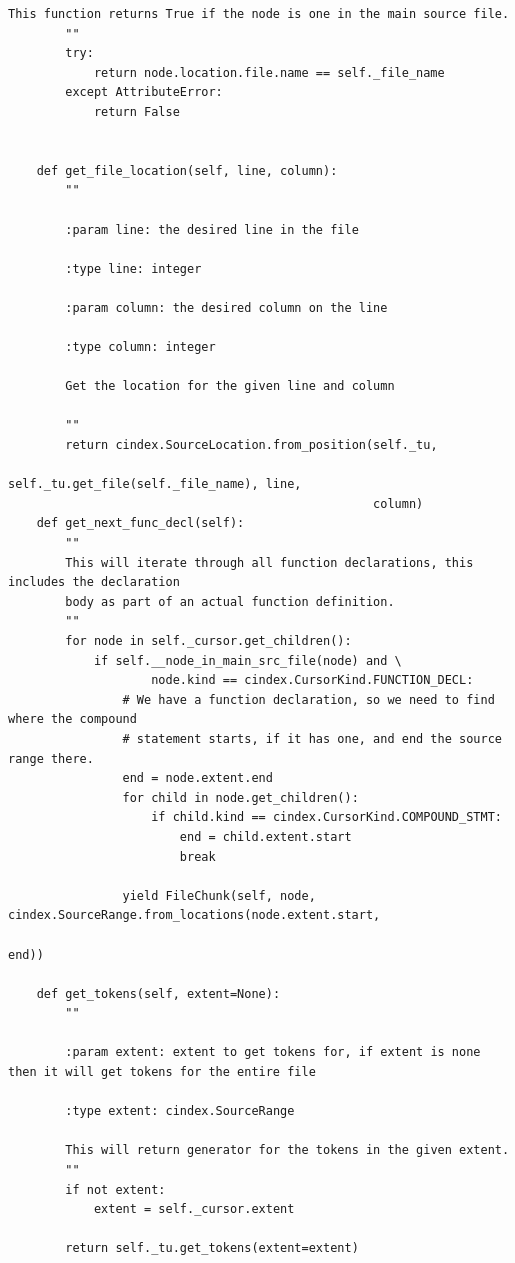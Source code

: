 \documentclass[11pt]{scrreprt}
\begin{document}
\begin{lstlisting}[frame=single,basicstyle=\small]
        This function returns True if the node is one in the main source file.
        ""
        try:
            return node.location.file.name == self._file_name
        except AttributeError:
            return False


    def get_file_location(self, line, column):
        ""

        :param line: the desired line in the file

        :type line: integer

        :param column: the desired column on the line

        :type column: integer

        Get the location for the given line and column

        ""
        return cindex.SourceLocation.from_position(self._tu,
                                                   self._tu.get_file(self._file_name), line,
                                                   column)
    def get_next_func_decl(self):
        ""
        This will iterate through all function declarations, this includes the declaration
        body as part of an actual function definition.
        ""
        for node in self._cursor.get_children():
            if self.__node_in_main_src_file(node) and \
                    node.kind == cindex.CursorKind.FUNCTION_DECL:
                # We have a function declaration, so we need to find where the compound
                # statement starts, if it has one, and end the source range there.
                end = node.extent.end
                for child in node.get_children():
                    if child.kind == cindex.CursorKind.COMPOUND_STMT:
                        end = child.extent.start
                        break

                yield FileChunk(self, node, cindex.SourceRange.from_locations(node.extent.start,
                                                                              end))

    def get_tokens(self, extent=None):
        ""

        :param extent: extent to get tokens for, if extent is none then it will get tokens for the entire file

        :type extent: cindex.SourceRange

        This will return generator for the tokens in the given extent.
        ""
        if not extent:
            extent = self._cursor.extent

        return self._tu.get_tokens(extent=extent)


\end{lstlisting}
\end{document}
